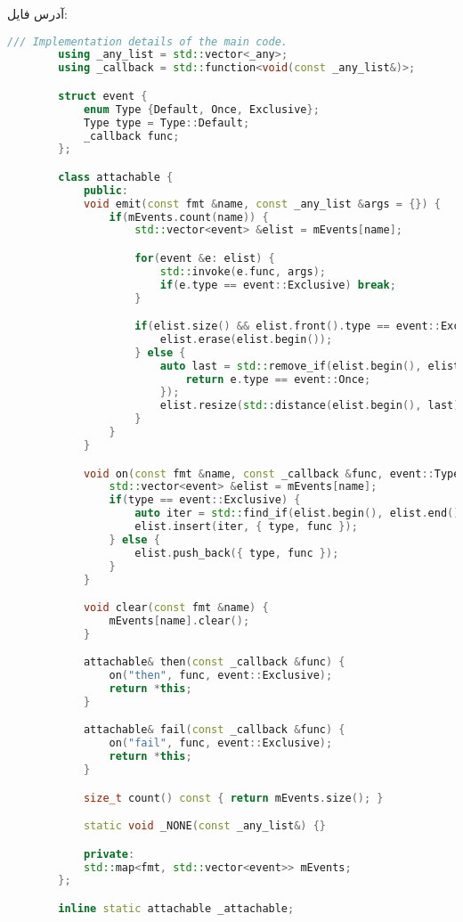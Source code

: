 آدرس فایل:
\hyperref{https://github.com/cardianco/cardian-hardware/blob/master/main/utils/attachable.h}{}{}{}
\begin{latin}
	\small
	\begin{lstlisting}[language=c++, caption={Attachable class implementation}]
		/// Implementation details of the main code.
		using _any_list = std::vector<_any>;
		using _callback = std::function<void(const _any_list&)>;

		struct event {
			enum Type {Default, Once, Exclusive};
			Type type = Type::Default;
			_callback func;
		};

		class attachable {
			public:
			void emit(const fmt &name, const _any_list &args = {}) {
				if(mEvents.count(name)) {
					std::vector<event> &elist = mEvents[name];

					for(event &e: elist) {
						std::invoke(e.func, args);
						if(e.type == event::Exclusive) break;
					}

					if(elist.size() && elist.front().type == event::Exclusive) {
						elist.erase(elist.begin());
					} else {
						auto last = std::remove_if(elist.begin(), elist.end(), [](event &e){
							return e.type == event::Once;
						});
						elist.resize(std::distance(elist.begin(), last));
					}
				}
			}

			void on(const fmt &name, const _callback &func, event::Type type = event::Default) {
				std::vector<event> &elist = mEvents[name];
				if(type == event::Exclusive) {
					auto iter = std::find_if(elist.begin(), elist.end(), [](event &e){ return e.type != event::Exclusive; });
					elist.insert(iter, { type, func });
				} else {
					elist.push_back({ type, func });
				}
			}

			void clear(const fmt &name) {
				mEvents[name].clear();
			}

			attachable& then(const _callback &func) {
				on("then", func, event::Exclusive);
				return *this;
			}

			attachable& fail(const _callback &func) {
				on("fail", func, event::Exclusive);
				return *this;
			}

			size_t count() const { return mEvents.size(); }

			static void _NONE(const _any_list&) {}

			private:
			std::map<fmt, std::vector<event>> mEvents;
		};

		inline static attachable _attachable;
	\end{lstlisting}
\end{latin}

